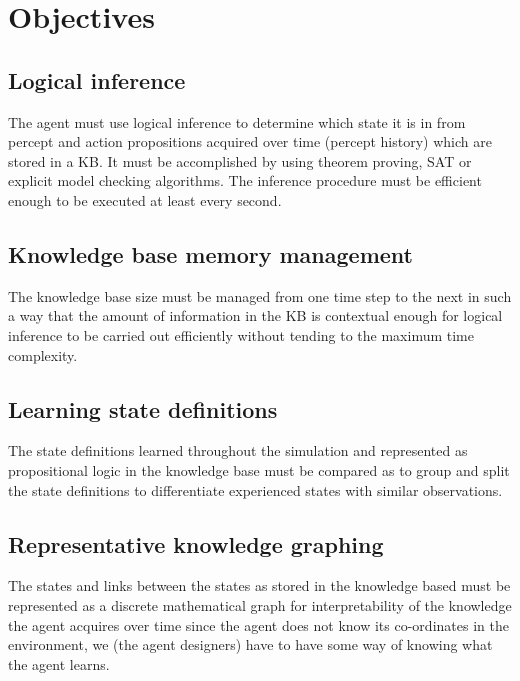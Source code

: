 \section{Objectives}
\subsection{Logical inference}
The agent must use logical inference to determine which state it is in from percept and action propositions acquired over time (percept history) which are stored in a KB. It must be accomplished by using theorem proving, SAT or explicit model checking algorithms. The inference procedure must be efficient enough to be executed at least every second.
\subsection{Knowledge base memory management}
The knowledge base size must be managed from one time step to the next in such a way that the amount of information in the KB is contextual enough for logical inference to be carried out efficiently without tending to the maximum time complexity.
\subsection{Learning state definitions}
The state definitions learned throughout the simulation and represented as propositional logic in the knowledge base must be compared as to group and split the state definitions to differentiate experienced states with similar observations.
\subsection{Representative knowledge graphing}
The states and links between the states as stored in the knowledge based must be represented as a discrete mathematical graph for interpretability of the knowledge the agent acquires over time since the agent does not know its co-ordinates in the environment, we (the agent designers) have to have some way of knowing what the agent learns.


